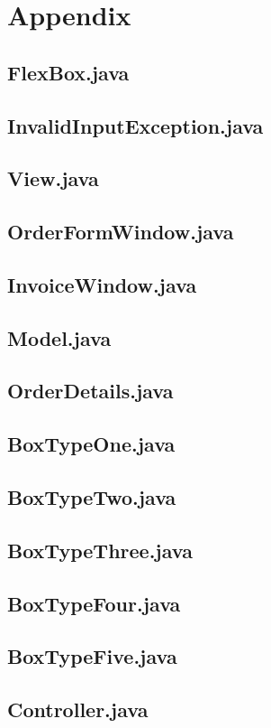 \documentclass[12pt]{article}
\begin{document}
\section{Appendix}
\subsection{FlexBox.java}

\newpage
\subsection{InvalidInputException.java}

\newpage
\subsection{View.java}

\newpage
\subsection{OrderFormWindow.java}

\newpage
\subsection{InvoiceWindow.java}

\newpage
\subsection{Model.java}

\newpage
\subsection{OrderDetails.java}

\newpage
\subsection{BoxTypeOne.java}

\newpage
\subsection{BoxTypeTwo.java}

\newpage
\subsection{BoxTypeThree.java}

\newpage
\subsection{BoxTypeFour.java}

\newpage
\subsection{BoxTypeFive.java}

\newpage
\subsection{Controller.java}

\end{document}

